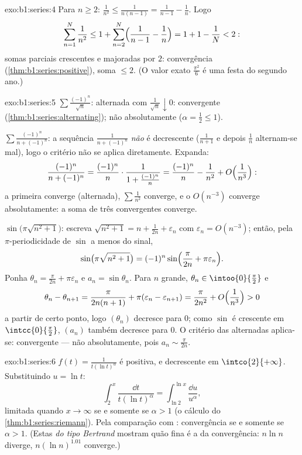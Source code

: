 \begin{solution}{exo:b1:series:4}
Para $n \geq 2$: $\frac{1}{n^2} \leq \frac{1}{n(n-1)} =
\frac{1}{n-1} - \frac1n$. Logo
\[
\sum_{n=1}^{N} \frac{1}{n^2} \leq 1 + \sum_{n=2}^{N}
\Bigl(\frac{1}{n-1} - \frac1n\Bigr) = 1 + 1 - \frac1N < 2 :
\]
somas parciais crescentes e majoradas por $2$: convergência
(\cref{thm:b1:series:positive}), soma $\leq 2$. (O valor exato
$\frac{\pi^2}{6}$ é uma festa do segundo ano.)
\end{solution}

\begin{solution}{exo:b1:series:5}
$\sum \frac{(-1)^n}{\sqrt n}$: alternada com $\frac{1}{\sqrt n}
\downarrow 0$: convergente (\cref{thm:b1:series:alternating}); não
absolutamente ($\alpha = \frac12 \leq 1$).

$\sum \frac{(-1)^n}{n + (-1)^n}$: a sequência $\frac{1}{n +
(-1)^n}$ \emph{não} é decrescente ($\frac{1}{n+1}$ e depois
$\frac{1}{n}$ alternam-se mal), logo o critério não se aplica diretamente.
Expanda:
\[
\frac{(-1)^n}{n + (-1)^n}
= \frac{(-1)^n}{n}\cdot\frac{1}{1 + \frac{(-1)^n}{n}}
= \frac{(-1)^n}{n} - \frac{1}{n^2} +
O\Bigl(\frac{1}{n^3}\Bigr):
\]
a primeira  converge (alternada), $\sum \frac{1}{n^2}$
converge, e o $O(n^{-3})$ converge absolutamente: a soma de três
 convergentes converge.

$\sin\bigl(\pi\sqrt{n^2+1}\bigr)$: escreva $\sqrt{n^2 + 1} = n +
\frac{1}{2n} + \varepsilon_n$ com $\varepsilon_n = O(n^{-3})$;
então, pela $\pi$-periodicidade de $\sin$ a menos do sinal,
\[
\sin\bigl(\pi\sqrt{n^2+1}\bigr)
= (-1)^n \sin\Bigl(\frac{\pi}{2n} + \pi\varepsilon_n\Bigr) .
\]
Ponha $\theta_n = \frac{\pi}{2n} + \pi\varepsilon_n$ e $a_n =
\sin\theta_n$. Para $n$ grande, $\theta_n \in \intoo{0}{\frac\pi2}$
e
\[
\theta_n - \theta_{n+1} = \frac{\pi}{2n(n+1)} +
\pi(\varepsilon_n - \varepsilon_{n+1})
= \frac{\pi}{2n^2} + O\Bigl(\frac{1}{n^3}\Bigr) > 0
\]
a partir de certo ponto, logo $(\theta_n)$ decresce para $0$; como $\sin$ é
crescente em $\intcc{0}{\frac\pi2}$, $(a_n)$ também decresce para $0$.
O critério das alternadas aplica-se: convergente --- não
absolutamente, pois $a_n \sim \frac{\pi}{2n}$.
\end{solution}

\begin{solution}{exo:b1:series:6}
$f(t) = \frac{1}{t(\ln t)^\alpha}$ é positiva,  e
decrescente em $\intco{2}{+\infty}$. Substituindo $u = \ln t$:
\[
\int_2^x \frac{\dd t}{t(\ln t)^\alpha}
= \int_{\ln 2}^{\ln x} \frac{\dd u}{u^\alpha},
\]
limitada quando $x \to \infty$ se e somente se $\alpha > 1$
(o cálculo do \cref{thm:b1:series:riemann}). Pela comparação com
: convergência se e somente se $\alpha > 1$. (Estas 
\emph{do tipo Bertrand} mostram quão fina é a  da
convergência: $n\ln n$ diverge, $n(\ln n)^{1.01}$ converge.)
\end{solution}

